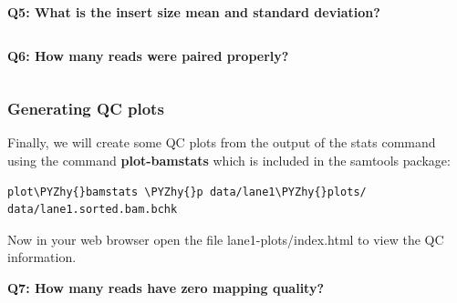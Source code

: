 \documentclass[11pt]{article}
\makeatletter
\def\PYZhy{\char`\-}
\newcommand{\boxspacing}{\kern\kvtcb@left@rule\kern\kvtcb@boxsep}
\newcommand{\prompt}[4]{
        \ttfamily\llap{{\color{#2}\LARGE\faKeyboardO\hspace{3pt}#4}}\vspace{-\baselineskip}
    }
\makeatother
\begin{document}
    \textbf{Q5: What is the insert size mean and standard deviation?}

    \begin{tcolorbox}[breakable, size=fbox, boxrule=1pt, pad at break*=1mm,colback=cellbackground, colframe=cellborder]
\prompt{In}{incolor}{ }{\boxspacing}
\begin{Verbatim}[commandchars=\\\{\}]

\end{Verbatim}
\end{tcolorbox}

    \textbf{Q6: How many reads were paired properly?}

    \begin{tcolorbox}[breakable, size=fbox, boxrule=1pt, pad at break*=1mm,colback=cellbackground, colframe=cellborder]
\prompt{In}{incolor}{ }{\boxspacing}
\begin{Verbatim}[commandchars=\\\{\}]

\end{Verbatim}
\end{tcolorbox}

    \hypertarget{generating-qc-plots}{%
\subsubsection{Generating QC plots}\label{generating-qc-plots}}

Finally, we will create some QC plots from the output of the stats
command using the command \textbf{plot-bamstats} which is included in
the samtools package:

    \begin{tcolorbox}[breakable, size=fbox, boxrule=1pt, pad at break*=1mm,colback=cellbackground, colframe=cellborder]
\prompt{In}{incolor}{ }{\boxspacing}
\begin{Verbatim}[commandchars=\\\{\}]
plot\PYZhy{}bamstats \PYZhy{}p data/lane1\PYZhy{}plots/ data/lane1.sorted.bam.bchk
\end{Verbatim}
\end{tcolorbox}

    Now in your web browser open the file lane1-plots/index.html to view the
QC information.

\textbf{Q7: How many reads have zero mapping quality?}

    \begin{tcolorbox}[breakable, size=fbox, boxrule=1pt, pad at break*=1mm,colback=cellbackground, colframe=cellborder]
\prompt{In}{incolor}{ }{\boxspacing}
\begin{Verbatim}[commandchars=\\\{\}]

\end{Verbatim}
\end{tcolorbox}
\end{document}

